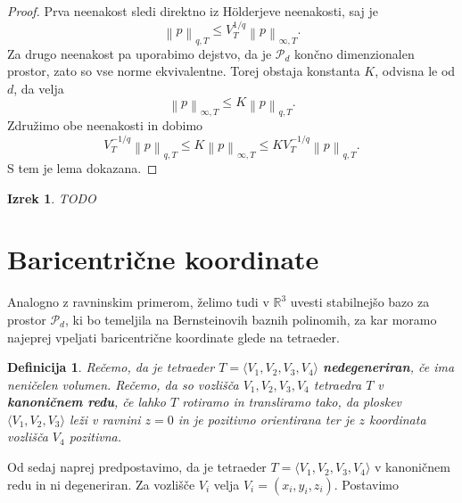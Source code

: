 \documentclass[11pt,a4paper]{article}
\newtheorem{definition}{Definicija}
\newtheorem{theorem}{Izrek}
\begin{document}
\begin{proof}
    Prva neenakost sledi direktno iz Hölderjeve neenakosti, saj je
    \begin{equation}
        \left\lVert p \right\rVert_{q,T} \leq V_T^{1/q} \left\lVert p \right\rVert_{\infty, T}.
    \end{equation}
    Za drugo neenakost pa uporabimo dejstvo, da je $\mathcal{P}_d$ končno dimenzionalen prostor, zato so vse norme ekvivalentne. Torej obstaja konstanta $K$, odvisna le od $d$, da velja
    \begin{equation}
        \left\lVert p \right\rVert_{\infty, T} \leq K \left\lVert p \right\rVert_{q,T}.
    \end{equation}
    Združimo obe neenakosti in dobimo
    \begin{equation}
        V_T^{-1/q} \left\lVert p \right\rVert_{q,T} \leq K \left\lVert p \right\rVert_{\infty, T} \leq K V_T^{-1/q} \left\lVert p \right\rVert_{q,T}.
    \end{equation}
    S tem je lema dokazana.
\end{proof}


\begin{theorem}
    TODO
\end{theorem}

\section{Baricentrične koordinate}

Analogno z ravninskim primerom, želimo tudi 
v $\mathbb{R}^3$ uvesti stabilnejšo bazo za prostor 
$\mathcal{P}_d$, ki bo temeljila na Bernsteinovih baznih polinomih,
za kar moramo najeprej vpeljati baricentrične koordinate glede na
tetraeder.

\begin{definition}
    Rečemo, da je tetraeder $T = \langle V_1, V_2, V_3, V_4 \rangle$ \textbf{nedegeneriran}, če ima neničelen volumen. Rečemo, da so vozlišča $V_1 , V_2 , V_3, V_4$ tetraedra $T$ v \textbf{kanoničnem redu}, če lahko $T$ rotiramo in transliramo  tako, da ploskev $\langle V_1, V_2, V_3\rangle$ leži v ravnini $z = 0$ in je pozitivno orientirana ter je $z$ koordinata vozlišča $V_4$ pozitivna.
\end{definition}

Od sedaj naprej predpostavimo, da je tetraeder $T = \langle V_1, V_2, V_3,V_4 \rangle$ v kanoničnem redu in ni degeneriran. 
Za vozlišče $V_i$ velja $V_i = (x_i, y_i, z_i)$. Postavimo 
\end{document}
